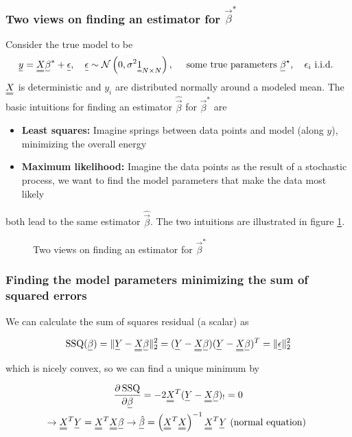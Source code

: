 \subsubsection{Two views on finding an estimator for $\vec{\beta}^*$}
Consider the true model to be
\begin{equation}
    \vec{y}=\mat{X} \vec{\beta}^*+\vec{\epsilon}, \quad \vec{\epsilon} \sim \mathcal{N}\left(0, \sigma^2 \mat{1}_{N \times N}\right), \quad \text { some true parameters } \vec{\beta}^{\star}, \quad \epsilon_i \text { i.i.d. }
\end{equation}
$\mat{X}$ is deterministic and $y_i$ are distributed normally around a modeled mean.
The basic intuitions for finding an estimator $\hat{\vec{\beta}}$ for $\vec{\beta}^*$ are
\begin{itemize}
    \item \textbf{Least squares:} Imagine springs between data points and model (along $y$), minimizing the overall energy
    \item \textbf{Maximum likelihood:} Imagine the data points as the result of a stochastic process, we want to find the model parameters that make the data most likely
\end{itemize}
both lead to the same estimator $\hat{\vec{\beta}}$. The two intuitions are illustrated in 
figure \ref{fig:two_views_lin}.

\begin{figure}[!htb]
 \centering
 \hfill
 \caption{Two views on finding an estimator for $\vec{\beta}^*$}
 \label{fig:two_views_lin}
\end{figure}

\subsubsection{Finding the model parameters minimizing the sum of squared errors}
We can calculate the sum of squares residual (a scalar) as

\begin{equation}
    \operatorname{SSQ}(\vec{\beta})=\|\vec{Y}-\mat{X} \vec{\beta}\|_2^2=(\vec{Y}-\mat{X} \vec{\beta})(\vec{Y}-\mat{X} \vec{\beta})^T=\|\vec{\epsilon}\|_2^2
\end{equation}

which is nicely convex, so we can find a unique minimum by

\begin{equation}
    \begin{gathered}
    \frac{\partial \operatorname{SSQ}}{\partial \vec{\beta}}=-2 \mat{X}^T(\vec{Y}-\mat{X} \vec{\beta})_{!}=0 \\
    \rightarrow \mat{X}^T \vec{Y}=\mat{X}^T \mat{X} \vec{\beta} \rightarrow \vec{\hat{\beta}}=\left(\mat{X}^T \mat{X}\right)^{-1} \mat{X}^T \vec{Y} \text { (normal equation) }
    \end{gathered}
\end{equation}

